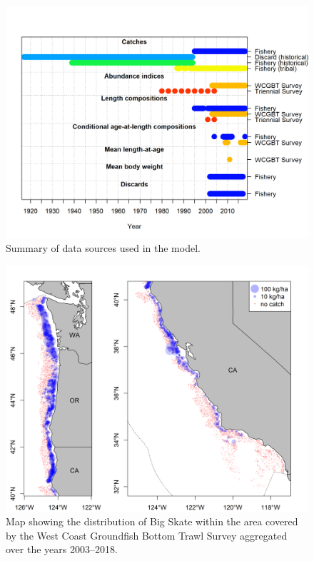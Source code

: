 \documentclass[12pt,]{article}
\begin{document}
\begin{figure}[H]
\begin{centering}
\includegraphics{r4ss/plots_mod1/data_plot.png}
\caption{Summary of data sources used in the model.}\label{fig:data_plot}
\end{centering}
\end{figure}

\newpage

\FloatBarrier

\newpage

\begin{figure}[H]
\begin{centering}
\includegraphics{Figures/survey_hauls_map.png}
\caption{Map showing the distribution of Big Skate within the area covered by the West Coast Groundfish Bottom Trawl Survey aggregated over the years 2003--2018.}\label{fig:survey_hauls_map}
\end{centering}
\end{figure}
\end{document}
